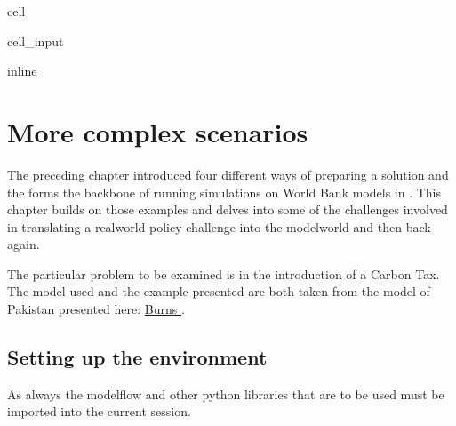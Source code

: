 \documentclass[letterpaper,10pt,english]{jupyterBook}
\begin{document}
\begin{sphinxuseclass}{cell}\begin{sphinxVerbatimInput}

\begin{sphinxuseclass}{cell_input}
\begin{sphinxVerbatim}[commandchars=\\\{\}]
 inline
\end{sphinxVerbatim}

\end{sphinxuseclass}\end{sphinxVerbatimInput}

\end{sphinxuseclass}

\chapter{More complex scenarios}
\label{\detokenize{content/05_WBModels/MoreComplexScenarios:more-complex-scenarios}}\label{\detokenize{content/05_WBModels/MoreComplexScenarios::doc}}
\sphinxAtStartPar
The preceding chapter introduced four different ways of preparing a solution and the forms the backbone of running simulations on World Bank models in . This chapter builds on those examples and delves into some of the challenges involved in translating a real\sphinxhyphen{}world policy challenge into the model\sphinxhyphen{}world and then back again.

\sphinxAtStartPar
The particular problem to be examined is in the introduction of a Carbon Tax. The model used and the example presented are both taken from the model of Pakistan presented here: \hyperlink{cite.content/99_BackMatter/References:id14}{Burns }.


\section{Setting up the environment}
\label{\detokenize{content/05_WBModels/MoreComplexScenarios:setting-up-the-environment}}
\sphinxAtStartPar
As always the modelflow and other python libraries that are to be used must be imported into the current session.
\end{document}
